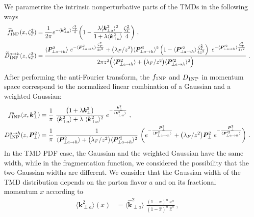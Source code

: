 \documentclass[aps,preprintnumbers,showpacs,nofootinbib,superscriptaddress,floatfix]{revtex4}
\newcommand{\T}{\perp}
\newcommand{\bT}{\zeta_T}
\begin{document}
We parametrize the intrinsic nonperturbative parts of the TMDs in the
following ways
\begin{align}
\widetilde{f}_{1 {\rm NP}}^a (x, \bT^2) &= \frac{1}{2\pi}
        e^{-\langle \bm{k}_{\T a}^2 \rangle \frac{\bT^2}{4}}
        \bigg( 1 - \frac{\lambda \langle \bm{k}_{\T a}^2 \rangle^2}{1+\lambda\langle \bm{k}_{\T a}^2 \rangle}  \frac{\bT^2}{4} \bigg)\  ,
\label{e:f1NP} \\
\widetilde{D}_{1 {\rm NP}}^{a \to h} (z, \bT^2) &= 
    \frac{ \langle \bm{P}_{\T a\to h}^2 \rangle \   e^{-\langle \bm{P}_{\T
          a\to h}^2 \rangle \frac{\bT^2}{4 z^2}}
        + \big(\lambda_F/z^2\big)    \langle \bm{P}_{\T a\to h}'^2 \rangle^2
    \left(1 - \langle \bm{P}_{\T a\to h}'^2 \rangle \frac{\bT^2}{4 z^2} \right)
         \  e^{- \langle \bm{P}_{\T a\to h}'^2 \rangle \frac{\bT^2}{4z^2}}}
     {2 \pi z^2 \Big(\langle \bm{P}_{\T a\to h}^2 \rangle + \big(\lambda_F/z^2\big)   \langle \bm{P}_{\T a\to h}'^2 \rangle^2\Big)} \  .
\label{e:D1NP}
\end{align} 
After performing the anti-Fourier transform, the $f_{1 \rm NP}$ and $D_{1\rm
  NP}$ in momentum space correspond to the normalized linear combination of
a Gaussian and a weighted Gaussian:
\begin{align} 
f_{1 {\rm NP}}^a (x, \bm{k}_{\T}^2) &= \frac{1}{\pi} \  
                        \frac{\big( 1 +\lambda \bm{k}_{\T}^2\big)}
                                {\langle \bm{k}_{\T a}^2 \rangle +\lambda \  \langle \bm{k}_{\T a}^2 \rangle^2}
                        \  e^{- \frac{\bm{k}_{\T}^2}{\langle \bm{k}_{\T a}^2 \rangle}} \  ,
\label{e:f1NPk}   \\
D_{1 {\rm NP}}^{a\to h} (z, \bm{P}_{\T}^2) &=  \frac{1}{\pi} \   
                  \frac{1}{\langle \bm{P}_{\T a\to h}^2 \rangle +
                    \big(\lambda_F/z^2\big) \langle \bm{P}_{\T a\to h}'^2 \rangle^2}
           \   \bigg( e^{- \frac{\bm{P}_{\T}^2}{\langle \bm{P}_{\T a\to h}^2 \rangle}}
                            + \big(\lambda_F/z^2\big)   \bm{P}_{\T}^2 \  
           e^{- \frac{\bm{P}_{\T}^2}{\langle \bm{P}_{\T a\to h}'^2 \rangle}} \bigg) \  .
\label{e:D1NPk}
\end{align} 
In the TMD PDF case, the Gaussian and the
weighted Gaussian have the same width, while in the fragmentation function, we
considered the possibility that the two Gaussian widths are different. 
We consider that the
Gaussian width of the TMD distribution depends 
on the parton flavor $a$ and on its fractional momentum $x$ according to
\begin{align} 
\big\langle \bm{k}_{\T a}^2 \big\rangle (x) &= \big\langle \hat{\bm{k}}_{\T a}^2 \big\rangle \;  
\frac{(1-x)^{\alpha} \  x^{\sigma} }{ (1 - \hat{x})^{\alpha} \  \hat{x}^{\sigma} } \, ,
\label{e:kT2_kin}
\end{align}
\end{document}
